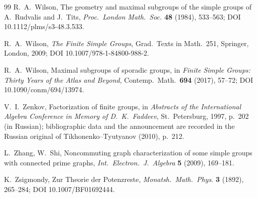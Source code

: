 \documentclass[11pt]{amsart}
\theoremstyle{definition}
\theoremstyle{remark}
\begin{document}
\begin{thebibliography}{99}
R.~A.~Wilson, The geometry and maximal subgroups of the simple groups
of A.~Rudvalis and J.~Tits, \emph{Proc.\ London Math.\ Soc.}
\textbf{48} (1984), 533--563; DOI 10.1112/plms/s3-48.3.533.

R.~A.~Wilson, \emph{The Finite Simple Groups}, Grad.\ Texts in Math.\ 251,
Springer, London, 2009; DOI 10.1007/978-1-84800-988-2.

R.~A.~Wilson, Maximal subgroups of sporadic groups, in \emph{Finite
Simple Groups: Thirty Years of the Atlas and Beyond}, Contemp.\ Math.\
\textbf{694} (2017), 57--72; DOI 10.1090/conm/694/13974.

V.~I.~Zenkov, Factorization of finite groups, in \emph{Abstracts of the
International Algebra Conference in Memory of D.~K.~Faddeev},
St.~Petersburg, 1997, p.~202 (in Russian); bibliographic data and the
announcement are recorded in the Russian original of
Tikhonenko--Tyutyanov (2010), p.~212.

L.~Zhang, W.~Shi, Noncommuting graph characterization of some simple
groups with connected prime graphs, \emph{Int.\ Electron.\ J.\ Algebra}
\textbf{5} (2009), 169--181.

K.~Zsigmondy, Zur Theorie der Potenzreste, \emph{Monatsh.\ Math.\
Phys.} \textbf{3} (1892), 265--284; DOI 10.1007/BF01692444.

\end{thebibliography}
\end{document}
